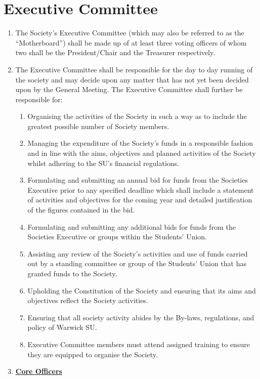 \documentclass{article}
\begin{document}
\section{Executive Committee}
\begin{enumerate}
    \item The Society’s Executive Committee (which may also be referred to as the “Motherboard”) shall be made up of at least three voting officers of whom two shall be the President/Chair and the Treasurer respectively.
    \item The Executive Committee shall be responsible for the day to day running of the society and may decide upon any matter that has not yet been decided upon by the General Meeting. The Executive Committee shall further be responsible for:
    \begin{enumerate}
        \item Organising the activities of the Society in such a way as to include the greatest possible number of Society members.
        \item Managing the expenditure of the Society’s funds in a responsible fashion and in line with the aims, objectives and planned activities of the Society whilst adhering to the SU’s financial regulations.
        \item Formulating and submitting an annual bid for funds from the Societies Executive prior to any specified deadline which shall include a statement of activities and objectives for the coming year and detailed justification of the figures contained in the bid.
        \item Formulating and submitting any additional bids for funds from the Societies Executive or groups within the Students’ Union.
        \item Assisting any review of the Society’s activities and use of funds carried out by a standing committee or group of the Students’ Union that has granted funds to the Society.
        \item Upholding the Constitution of the Society and ensuring that its aims and objectives reflect the Society activities.
        \item Ensuring that all society activity abides by the By-laws, regulations, and policy of Warwick SU.
        \item Executive Committee members must attend assigned training to ensure they are equipped to organise the Society.
    \end{enumerate}
    \item \textbf{\underline{Core Officers}}

\end{enumerate}
\end{document}

